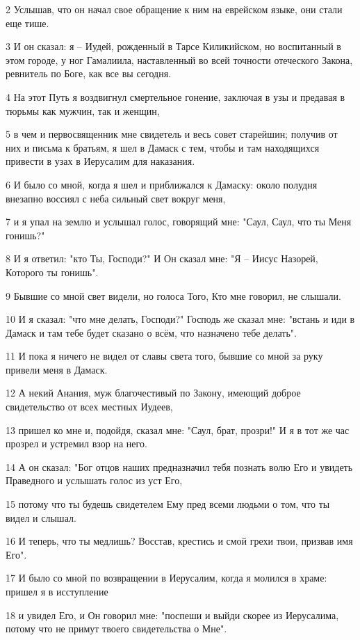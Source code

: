 2 Услышав, что он начал свое обращение к ним на еврейском языке, они стали еще тише.

3 И он сказал: я – Иудей, рожденный в Тарсе Киликийском, но воспитанный в этом городе, у ног Гамалиила, наставленный во всей точности отеческого Закона, ревнитель по Боге, как все вы сегодня.

4 На этот Путь я воздвигнул смертельное гонение, заключая в узы и предавая в тюрьмы как мужчин, так и женщин,

5 в чем и первосвященник мне свидетель и весь совет старейшин; получив от них и письма к братьям, я шел в Дамаск с тем, чтобы и там находящихся привести в узах в Иерусалим для наказания.

6 И было со мной, когда я шел и приближался к Дамаску: около полудня внезапно воссиял с неба сильный свет вокруг меня,

7 и я упал на землю и услышал голос, говорящий мне: "Саул, Саул, что ты Меня гонишь?"

8 И я ответил: "кто Ты, Господи?" И Он сказал мне: "Я – Иисус Назорей, Которого ты гонишь".

9 Бывшие со мной свет видели, но голоса Того, Кто мне говорил, не слышали.

10 И я сказал: "что мне делать, Господи?" Господь же сказал мне: "встань и иди в Дамаск и там тебе будет сказано о всём, что назначено тебе делать".

11 И пока я ничего не видел от славы света того, бывшие со мной за руку привели меня в Дамаск.

12 А некий Анания, муж благочестивый по Закону, имеющий доброе свидетельство от всех местных Иудеев,

13 пришел ко мне и, подойдя, сказал мне: "Саул, брат, прозри!" И я в тот же час прозрел и устремил взор на него.

14 А он сказал: "Бог отцов наших предназначил тебя познать волю Его и увидеть Праведного и услышать голос из уст Его,

15 потому что ты будешь свидетелем Ему пред всеми людьми о том, что ты видел и слышал.

16 И теперь, что ты медлишь? Восстав, крестись и смой грехи твои, призвав имя Его".

17 И было со мной по возвращении в Иерусалим, когда я молился в храме: пришел я в исступление

18 и увидел Его, и Он говорил мне: "поспеши и выйди скорее из Иерусалима, потому что не примут твоего свидетельства о Мне".

